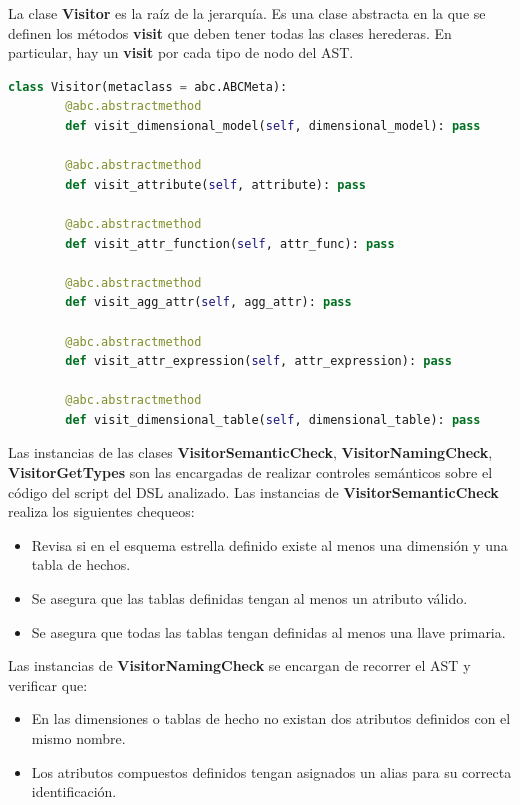 La clase \textbf{Visitor} es la raíz de la jerarquía. Es una clase abstracta en la que se definen los métodos 
\textbf{visit} que deben tener todas las clases herederas. En particular, hay un \textbf{visit} por cada tipo de 
nodo del AST. 

\begin{lstlisting}[label={code:visitors}, caption={Clase Visitor}, language={python}]
    class Visitor(metaclass = abc.ABCMeta):
        @abc.abstractmethod
        def visit_dimensional_model(self, dimensional_model): pass 

        @abc.abstractmethod
        def visit_attribute(self, attribute): pass

        @abc.abstractmethod
        def visit_attr_function(self, attr_func): pass

        @abc.abstractmethod
        def visit_agg_attr(self, agg_attr): pass

        @abc.abstractmethod
        def visit_attr_expression(self, attr_expression): pass

        @abc.abstractmethod
        def visit_dimensional_table(self, dimensional_table): pass
\end{lstlisting}

Las instancias de las clases \textbf{VisitorSemanticCheck}, \textbf{VisitorNamingCheck}, \textbf{VisitorGetTypes} 
son las encargadas de realizar
controles semánticos sobre el código del script del DSL analizado. Las instancias de \textbf{VisitorSemanticCheck} realiza los siguientes 
chequeos:

\begin{itemize}
    \item Revisa si en el esquema estrella definido existe al menos una dimensión y una tabla de hechos.
    \item Se asegura que las tablas definidas tengan al menos un atributo válido.
    \item Se asegura que todas las tablas tengan definidas al menos una llave primaria.
\end{itemize}

Las instancias de \textbf{VisitorNamingCheck} se encargan de recorrer el AST y verificar que: 

\begin{itemize}
    \item En las dimensiones o tablas de hecho no existan dos atributos definidos con el mismo nombre.
    \item Los atributos compuestos definidos tengan asignados un alias para su correcta identificación.
\end{itemize}

